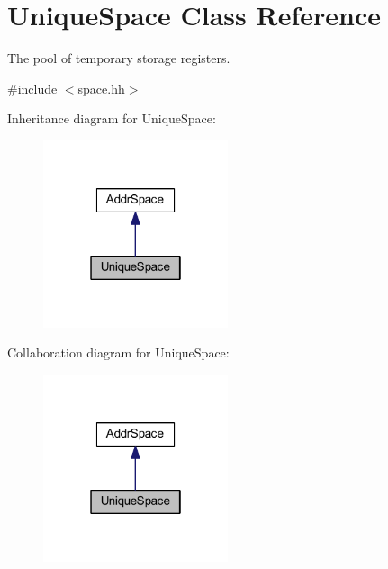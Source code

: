 \hypertarget{class_unique_space}{}\section{Unique\+Space Class Reference}
\label{class_unique_space}


The pool of temporary storage registers.  




{\ttfamily \#include $<$space.\+hh$>$}



Inheritance diagram for Unique\+Space\+:
\nopagebreak
\begin{figure}[H]
\begin{center}
\leavevmode
\includegraphics[width=154pt]{class_unique_space__inherit__graph}
\end{center}
\end{figure}


Collaboration diagram for Unique\+Space\+:
\nopagebreak
\begin{figure}[H]
\begin{center}
\leavevmode
\includegraphics[width=154pt]{class_unique_space__coll__graph}
\end{center}
\end{figure}
